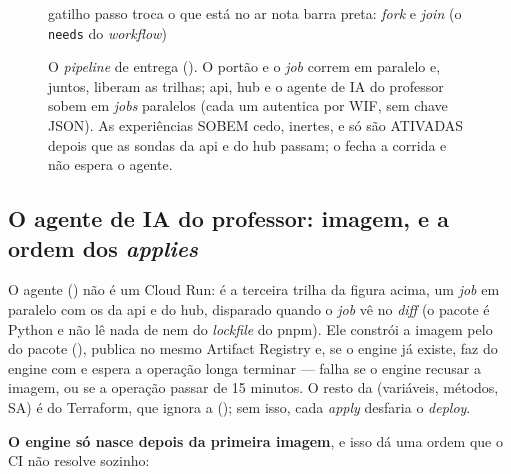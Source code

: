 \begin{figure}[H]
{}
\begin{legendadiag}
 gatilho \quad
{} passo \quad
{} troca o que está no ar \quad
{} nota \quad
barra preta: \emph{fork} e \emph{join} (o \texttt{needs} do \emph{workflow})
\end{legendadiag}
\caption[Pipeline de entrega]{O \emph{pipeline} de entrega
  (). O portão e o \emph{job} 
  correm em paralelo e, juntos, liberam as trilhas; api, hub e o agente de IA do
  professor sobem em \emph{jobs} paralelos (cada um autentica por WIF, sem chave
  JSON). As experiências SOBEM cedo, inertes, e só são ATIVADAS depois que as
  sondas da api e do hub passam; o  fecha a corrida e não espera o
  agente.}
\label{fig:pipeline-deploy}
\end{figure}

\subsection{O agente de IA do professor: imagem,  e a ordem dos \emph{applies}}

O agente () não é um Cloud Run: é a terceira trilha da figura
acima, um \emph{job}  em paralelo com os da api e
do hub, disparado quando o \emph{job}  vê 
no \emph{diff} (o pacote é Python e não lê nada de  nem do
\emph{lockfile} do pnpm). Ele constrói a imagem pelo  do pacote
(), publica
 no mesmo Artifact
Registry e, se o engine já existe, faz  do engine com
 e espera a operação longa terminar
--- falha se o engine recusar a imagem, ou se a operação passar de 15 minutos.
O resto da  (variáveis, métodos, SA) é do Terraform, que ignora a
 (); sem isso, cada \emph{apply} desfaria o
\emph{deploy}.

\textbf{O engine só nasce depois da primeira imagem}, e isso dá uma ordem que o
CI não resolve sozinho:

